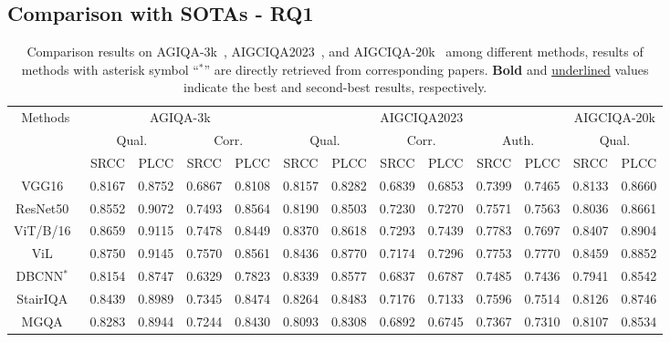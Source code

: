 
\subsection{Comparison with SOTAs - RQ1}
\begin{table*}
    \centering
    \caption{Comparison results on AGIQA-3k~\cite{li2023agiqa}, AIGCIQA2023~\cite{wang2023aigciqa2023}, and AIGCIQA-20k~\cite{li2024aigiqa} among different methods, results of methods with asterisk symbol ``$^\ast$'' are directly retrieved from corresponding papers. \textbf{Bold} and \underline{underlined} values indicate the best and second-best results, respectively.}
    \label{tab:comparison}
    \begin{tabular}{c|c c|c c| c c|c c|c c| c c}
        \toprule
        \multirow{3}{*}{Methods} & \multicolumn{4}{c|}{AGIQA-3k} & \multicolumn{6}{c|}{AIGCIQA2023} & \multicolumn{2}{c}{AIGCIQA-20k} \\
        \cline{2-13}
        & \multicolumn{2}{c|}{Qual.} & \multicolumn{2}{c|}{Corr.} & \multicolumn{2}{c|}{Qual.} & \multicolumn{2}{c|}{Corr.} & \multicolumn{2}{c|}{Auth.} & \multicolumn{2}{c}{Qual.} \\
        \cline{2-13}
        & SRCC & PLCC & SRCC & PLCC & SRCC & PLCC & SRCC & PLCC & SRCC & PLCC & SRCC & PLCC \\
        \midrule
        VGG16~\cite{simonyan2014very} & 0.8167 & 0.8752 & 0.6867 & 0.8108 & 0.8157 & 0.8282 & 0.6839 & 0.6853 & 0.7399 & 0.7465 & 0.8133 & 0.8660 \\
        ResNet50~\cite{he2016deep} & 0.8552 & 0.9072 & 0.7493 & 0.8564 & 0.8190 & 0.8503 & 0.7230 & 0.7270 & 0.7571 & 0.7563 & 0.8036 & 0.8661 \\
        ViT/B/16~\cite{dosovitskiy2020image} & 0.8659 & 0.9115 & 0.7478 & 0.8449 & 0.8370 & 0.8618 & 0.7293 & 0.7439 & 0.7783 & 0.7697 & 0.8407 & 0.8904 \\
        ViL~\cite{alkin2024visionlstm} & 0.8750 & 0.9145 & 0.7570 & 0.8561 & 0.8436 & 0.8770 & 0.7174 & 0.7296 & 0.7753 & 0.7770 & 0.8459 & 0.8852 \\ 
        \midrule
        DBCNN$^\ast$~\cite{zhang2018blind} & 0.8154 & 0.8747 & 0.6329 & 0.7823 & 0.8339 & 0.8577 & 0.6837 & 0.6787 & 0.7485 & 0.7436 & 0.7941 & 0.8542 \\
        StairIQA~\cite{sun2022blind} & 0.8439 & 0.8989 & 0.7345 & 0.8474 & 0.8264 & 0.8483 & 0.7176 & 0.7133 & 0.7596 & 0.7514 & 0.8126 & 0.8746 \\
        MGQA~\cite{wang2021multi} & 0.8283 & 0.8944  & 0.7244 & 0.8430 & 0.8093 & 0.8308 & 0.6892 & 0.6745 & 0.7367 & 0.7310 & 0.8107 & 0.8534  \\

\end{tabular}
\end{table*}
